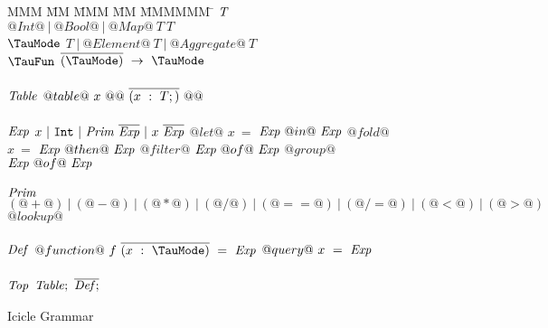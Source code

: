 
\begin{figure}

\begin{tabbing}
MMM \= MM \= MMM \= MM \= MMMMMM \= \kill
$\mathit{T}$
\GrammarDef
  $@Int@~|~@Bool@~|~@Map@~T~T$
\\
$\mi{\TauMode}$
\GrammarDef
  $T~|~@Element@~T~|~@Aggregate@~T$
\\
$\mi{\TauFun}$
\GrammarDef
  $\ov{(\TauMode)}~\to~\TauMode$
\\
\\

$\mathit{Table}$
\GrammarDef
  $@table@~x~@{@~\overline{(x~:~T;)}~@}@$
\\
\\

$\mathit{Exp}$
\GrammarDef
  $x~|~\mathtt{Int}~|~\mathit{Prim}~\overline{\mathit{Exp}}~|~x~\overline{\mathit{Exp}}$
\GrammarAlt
  $@let@$   \> $x~=$ \> $\mathit{Exp}~@  in@~\mathit{Exp}$
\GrammarAlt
  $@fold@$  \> $x~=$ \> $\mathit{Exp}~@then@~\mathit{Exp}$
\GrammarAlt
  $@filter@$\> \> $\mathit{Exp}~@  of@~\mathit{Exp}$
\GrammarAlt
  $@group@$ \> \> $\mathit{Exp}~@  of@~\mathit{Exp}$
\\
\\

$\mathit{Prim}$
\GrammarDef
  $(@+@)~|~(@-@)~|~(@*@)~|~(@/@)~|~(@==@)~|~(@/=@)~|~(@<@)~|~(@>@)$
\GrammarAlt
  $@lookup@$
\\
\\


$\mathit{Def}$
\GrammarDef
  $@function@~f~\ov{(x~:~\TauMode)}~=~\mi{Exp}$
\GrammarAlt
  $@query@~x~=~\mathit{Exp}$
\\
\\
$\mathit{Top}$
\GrammarDef
  $\mathit{Table};~\overline{\mathit{Def};}$
\end{tabbing}

\caption{Icicle Grammar}
\label{fig:source:grammar}
\end{figure}

